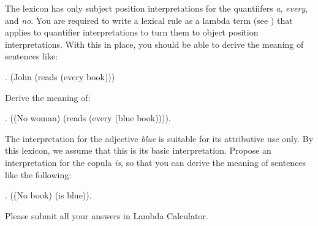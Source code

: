 \documentclass[10pt,a4paper]{exam}
\begin{document}
\begin{questions}
\question

The lexicon has only subject position interpretations for the
quantiifers \emph{a}, \emph{every}, and \emph{no}. You are required to
write a lexical rule as a lambda term (see ) that applies
to quantifier interpretations to turn them to object position
interpretations. With this in place, you should be able to derive the
meaning of sentences like:

\ex. (John (reads (every book)))

\question

Derive the meaning of:

\ex. ((No woman) (reads (every (blue book)))).


\question

The interpretation for the adjective \emph{blue} is suitable for its
attributive use only. By this lexicon, we assume that this is its
basic interpretation. Propose an interpretation for the copula
\emph{is}, so that you can derive the meaning of sentences like the
following:

\ex. ((No book) (is blue)).



\end{questions}


Please submit all your answers in Lambda Calculator.
\end{document}
